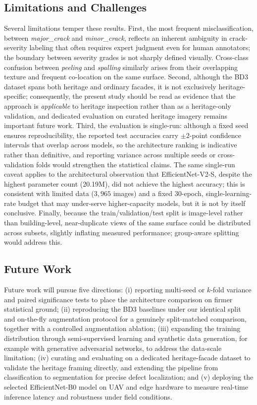 \documentclass[conference]{IEEEtran}
\begin{document}
\subsection{Limitations and Challenges}
\label{sec:limitations}
Several limitations temper these results. First, the most frequent misclassification, between \textit{major\_crack} and \textit{minor\_crack}, reflects an inherent ambiguity in crack-severity labeling that often requires expert judgment even for human annotators; the boundary between severity grades is not sharply defined visually. Cross-class confusion between \textit{peeling} and \textit{spalling} similarly arises from their overlapping texture and frequent co-location on the same surface. Second, although the BD3 dataset spans both heritage and ordinary facades, it is not exclusively heritage-specific; consequently, the present study should be read as evidence that the approach is \emph{applicable} to heritage inspection rather than as a heritage-only validation, and dedicated evaluation on curated heritage imagery remains important future work. Third, the evaluation is single-run: although a fixed seed ensures reproducibility, the reported test accuracies carry $\pm2$-point confidence intervals that overlap across models, so the architecture ranking is indicative rather than definitive, and reporting variance across multiple seeds or cross-validation folds would strengthen the statistical claims. The same single-run caveat applies to the architectural observation that EfficientNet-V2-S, despite the highest parameter count (20.19M), did not achieve the highest accuracy; this is consistent with limited data ($3{,}965$ images) and a fixed 30-epoch, single-learning-rate budget that may under-serve higher-capacity models, but it is not by itself conclusive. Finally, because the train/validation/test split is image-level rather than building-level, near-duplicate views of the same surface could be distributed across subsets, slightly inflating measured performance; group-aware splitting would address this.

\subsection{Future Work}
Future work will pursue five directions: (i) reporting multi-seed or $k$-fold variance and paired significance tests to place the architecture comparison on firmer statistical ground; (ii) reproducing the BD3 baselines under our identical split and on-the-fly augmentation protocol for a genuinely split-matched comparison, together with a controlled augmentation ablation; (iii) expanding the training distribution through semi-supervised learning and synthetic data generation, for example with generative adversarial networks, to address the data-scale limitation; (iv) curating and evaluating on a dedicated heritage-facade dataset to validate the heritage framing directly, and extending the pipeline from classification to segmentation for precise defect localization; and (v) deploying the selected EfficientNet-B0 model on UAV and edge hardware to measure real-time inference latency and robustness under field conditions.
\end{document}
